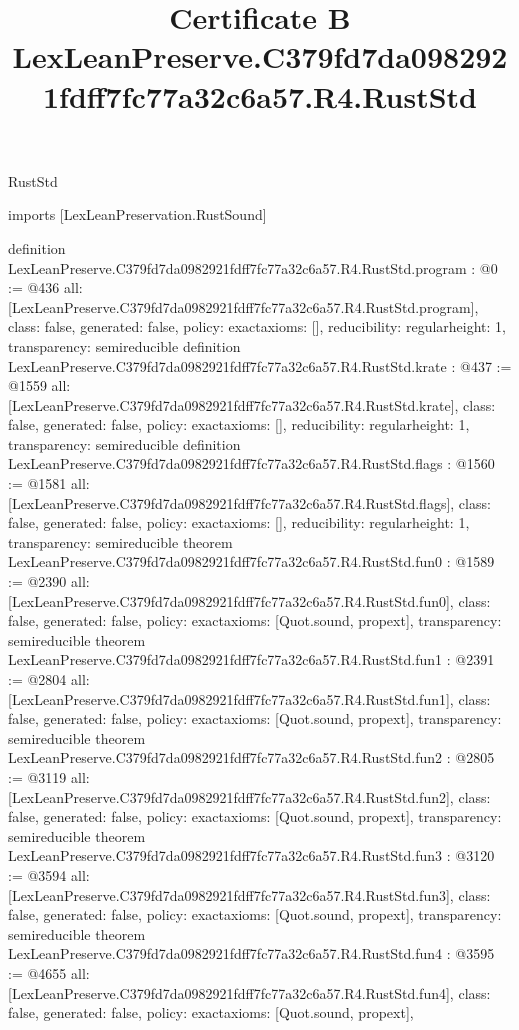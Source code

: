 \begin{lexlean}{RustStd}
\title{Certificate B LexLeanPreserve.C379fd7da0982921fdff7fc77a32c6a57.R4.RustStd}
\begin{coremodule}
imports [LexLeanPreservation.RustSound]

definition LexLeanPreserve.C379fd7da0982921fdff7fc77a32c6a57.R4.RustStd.program : @0 := @436 {
  all: [LexLeanPreserve.C379fd7da0982921fdff7fc77a32c6a57.R4.RustStd.program],
  class: false,
  generated: false,
  policy: exact{axioms: []},
  reducibility: regular{height: 1},
  transparency: semireducible
}
definition LexLeanPreserve.C379fd7da0982921fdff7fc77a32c6a57.R4.RustStd.krate : @437 := @1559 {
  all: [LexLeanPreserve.C379fd7da0982921fdff7fc77a32c6a57.R4.RustStd.krate],
  class: false,
  generated: false,
  policy: exact{axioms: []},
  reducibility: regular{height: 1},
  transparency: semireducible
}
definition LexLeanPreserve.C379fd7da0982921fdff7fc77a32c6a57.R4.RustStd.flags : @1560 := @1581 {
  all: [LexLeanPreserve.C379fd7da0982921fdff7fc77a32c6a57.R4.RustStd.flags],
  class: false,
  generated: false,
  policy: exact{axioms: []},
  reducibility: regular{height: 1},
  transparency: semireducible
}
theorem LexLeanPreserve.C379fd7da0982921fdff7fc77a32c6a57.R4.RustStd.fun0 : @1589 := @2390 {
  all: [LexLeanPreserve.C379fd7da0982921fdff7fc77a32c6a57.R4.RustStd.fun0],
  class: false,
  generated: false,
  policy: exact{axioms: [Quot.sound, propext]},
  transparency: semireducible
}
theorem LexLeanPreserve.C379fd7da0982921fdff7fc77a32c6a57.R4.RustStd.fun1 : @2391 := @2804 {
  all: [LexLeanPreserve.C379fd7da0982921fdff7fc77a32c6a57.R4.RustStd.fun1],
  class: false,
  generated: false,
  policy: exact{axioms: [Quot.sound, propext]},
  transparency: semireducible
}
theorem LexLeanPreserve.C379fd7da0982921fdff7fc77a32c6a57.R4.RustStd.fun2 : @2805 := @3119 {
  all: [LexLeanPreserve.C379fd7da0982921fdff7fc77a32c6a57.R4.RustStd.fun2],
  class: false,
  generated: false,
  policy: exact{axioms: [Quot.sound, propext]},
  transparency: semireducible
}
theorem LexLeanPreserve.C379fd7da0982921fdff7fc77a32c6a57.R4.RustStd.fun3 : @3120 := @3594 {
  all: [LexLeanPreserve.C379fd7da0982921fdff7fc77a32c6a57.R4.RustStd.fun3],
  class: false,
  generated: false,
  policy: exact{axioms: [Quot.sound, propext]},
  transparency: semireducible
}
theorem LexLeanPreserve.C379fd7da0982921fdff7fc77a32c6a57.R4.RustStd.fun4 : @3595 := @4655 {
  all: [LexLeanPreserve.C379fd7da0982921fdff7fc77a32c6a57.R4.RustStd.fun4],
  class: false,
  generated: false,
  policy: exact{axioms: [Quot.sound, propext]},
}
\end{coremodule}
\end{lexlean}
